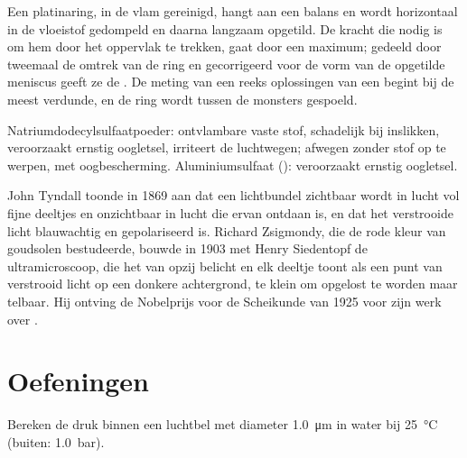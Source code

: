 \begin{inthelab}
Een platinaring, in de vlam gereinigd, hangt aan een balans en wordt
horizontaal in de vloeistof gedompeld en daarna langzaam opgetild. De
kracht die nodig is om hem door het oppervlak te trekken, gaat door een
maximum; gedeeld door tweemaal de omtrek van de ring en gecorrigeerd voor
de vorm van de opgetilde meniscus geeft ze de . De
meting van een reeks oplossingen van een  begint
bij de meest verdunde, en de ring wordt tussen de monsters gespoeld.
\end{inthelab}

\begin{safety}{}
Natriumdodecylsulfaatpoeder: ontvlambare vaste stof, schadelijk bij
inslikken, veroorzaakt ernstig oogletsel, irriteert de luchtwegen; afwegen
zonder stof op te werpen, met oogbescherming. Aluminiumsulfaat ():
veroorzaakt ernstig oogletsel.
\end{safety}

\begin{history}
John Tyndall toonde in 1869 aan dat een lichtbundel zichtbaar wordt in
lucht vol fijne deeltjes en onzichtbaar in lucht die ervan ontdaan is, en
dat het verstrooide licht blauwachtig en gepolariseerd is. Richard
Zsigmondy, die de rode kleur van goudsolen bestudeerde, bouwde in 1903 met
Henry Siedentopf de ultramicroscoop, die het  van opzij belicht en
elk deeltje toont als een punt van verstrooid licht op een donkere
achtergrond, te klein om opgelost te worden maar telbaar. Hij ontving de
Nobelprijs voor de Scheikunde van 1925 voor zijn werk over .
\end{history}

\section{Oefeningen}

\begin{exercise}[$\star$]\label{exo:b3:colloids:1}
Bereken de druk binnen een luchtbel met diameter \qty{1.0}{\micro m} in water bij
\qty{25}{\celsius} (buiten: \qty{1.0}{bar}).
\end{exercise}

